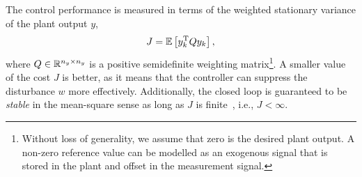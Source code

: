 The control performance is measured in terms of the weighted stationary variance of the plant output $y$,
\begin{equation}
    \label{eq:cost}
    J = \E{ y_k^{\T} Q y_k },
\end{equation}
where $Q \in \mathbb{R}^{n_y \times n_y}$ is a positive semidefinite weighting matrix\footnote{Without loss of generality, we assume that zero is the desired plant output. A non-zero reference value can be modelled as an exogenous signal that is stored in the plant and offset in the measurement signal.}.
A smaller value of the cost $J$ is better, as it means that the controller can suppress the disturbance $w$ more effectively.
Additionally, the closed loop is guaranteed to be \emph{stable} in the mean-square sense as long as $J$ is finite~\cite{Fang:2002}, i.e., $J < \infty$.


